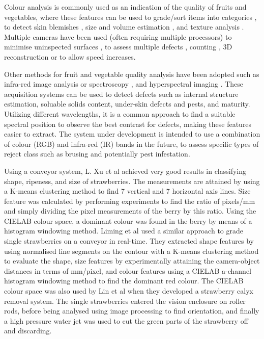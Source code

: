 \documentclass{bmvc2k}
\begin{document}
Colour analysis is commonly used as an indication of the quality of fruits and vegetables, where these features can be used to grade/sort items into categories \cite{jun, elmasry}, to detect skin blemishes \cite{blasco, leemans}, size and volume estimation \cite{bundit, elmasry}, and texture analysis \cite{jun, rakuna}. Multiple cameras have been used (often requiring multiple processors) to minimise uninspected surfaces \cite{zouxiou, quingzong}, to assess multiple defects \cite{blasko2}, counting \cite{song}, 3D reconstruction \cite{panitat} or to allow speed increases\cite{recce}.   

Other methods for fruit and vegetable quality analysis have been adopted such as infra-red image analysis or spectroscopy \cite{guthrie, bureau, yande}, and hyperspectral imaging \cite{renfu} \cite{jianwei, mendoza, rajkumar}. These acquisition systems can be used to detect defects such as internal structure estimation, soluable solids content, under-skin defects and pests, and maturity. Utilizing different wavelengths, it is a common approach to find a suitable spectral position to observe the best contrast for defects, making these features easier to extract\cite{ariana, piotr}. The system under development is intended to use a combination of colour (RGB) and infra-red (IR) bands in the future, to assess specific types of reject class such as brusing and potentially pest infestation. 

Using a conveyor system, L. Xu et al \cite{xu} achieved very good results in classifying shape, ripeness, and size of strawberries. The measurements are attained by using a K-means clustering method to find 7 vertical and 7 horizontal axis lines. Size feature was calculated by performing experiments to find the ratio of pixels/mm and simply dividing the pixel measurements of the berry by this ratio. Using the CIELAB colour space, a dominant colour was found in the berry by means of a histogram windowing method. Liming et al \cite{liming} used a similar approach to grade single strawberries on a conveyor in real-time. They extracted shape features by using normalised line segments on the contour with a K-means clustering method to evaluate the shape, size features by experimentally attaining the camera-object distances in terms of mm/pixel, and colour features using a CIELAB a-channel histogram windowing method to find the dominant red colour. The CIELAB colour space was also used by Lin et al \cite{lin} when they developed a strawberry calyx removal system. The single strawberries entered the vision enclosure on roller rods, before being analysed using image processing to find orientation, and finally a high pressure water jet was used to cut the green parts of the strawberry off and discarding.
\end{document}
